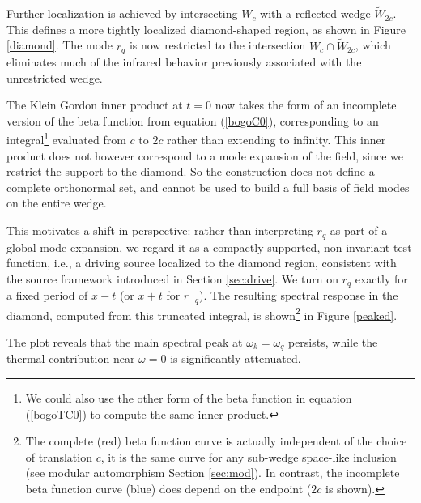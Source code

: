 \documentclass[12pt,a4paper]{article}
\begin{document}
{Further localization is achieved by intersecting $W_c$ with a reflected wedge $\widetilde{W}_{2c}$. This defines a more tightly localized diamond-shaped region, as shown in Figure \ref{diamond}. The mode $r_q$ is now restricted to the intersection $W_c \cap \widetilde{W}_{2c}$, which eliminates much of the infrared behavior previously associated with the unrestricted wedge.

The Klein Gordon inner product at $t=0$ now takes the form of an incomplete version of the beta function from equation (\ref{bogoC0}), corresponding to an integral\footnote{We could also use the other form of the beta function in equation (\ref{bogoTC0}) to compute the same inner product.} evaluated from $c$ to $2c$ rather than extending to infinity. This inner product does not however correspond to a mode expansion of the field, since we restrict the support to the diamond. So the construction does not define a complete orthonormal set, and cannot be used to build a full basis of field modes on the entire wedge.

This motivates a shift in perspective: rather than interpreting $r_q$ as part of a global mode expansion, we regard it as a compactly supported, non-invariant test function, i.e., a driving source localized to the diamond region, consistent with the source framework introduced in Section \ref{sec:drive}. We turn on $r_q$ exactly for a fixed period of $x-t$ (or $x+t$ for $r_{-q}$). The resulting spectral response in the diamond, computed from this truncated integral, is shown\footnote{The complete (red) beta function curve is actually independent of the choice of translation $c$, it is the same curve for any sub-wedge space-like inclusion (see modular automorphism Section \ref{sec:mod}). In contrast, the incomplete beta function curve (blue) does depend on the endpoint ($2c$ is shown).} in Figure \ref{peaked}.


The plot reveals that the main spectral peak at $\omega_k = \omega_q$ persists, while the thermal contribution near $\omega = 0$ is significantly attenuated.

}
\end{document}
